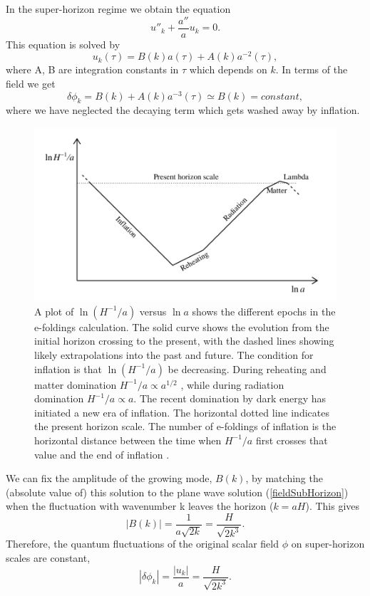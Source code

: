 \documentclass[11pt,a4paper,twoside]{book}
\begin{document}
In the super-horizon regime we obtain the equation
\begin{equation}
	\label{superHorizon}
	u''_{k} + \frac{a''}{a}u_{k}=0.
\end{equation}
This equation is solved by
\begin{equation}
	\label{solutionSuperHorizon}
	u_{k}(\tau) = B(k)a(\tau) + A(k)a^{-2}(\tau),
\end{equation}
where A, B are integration constants in $ \tau $ which depends on $ k $. In terms of the field we get
\begin{equation}
	\delta\phi_{k} = B(k) + A(k)a^{-3}(\tau) \simeq B(k) = constant,
\end{equation}
where we have neglected the decaying term which gets washed away by inflation.
\begin{figure}
	\centering
	\includegraphics[width=0.85\linewidth, height=0.3\textheight]{Images/Chap1/ComovingScale}
	\caption{A plot of $\ln (H^{-1}/a)$ versus $\ln a$ shows the different
		epochs in the e-foldings calculation. The solid curve shows the
		evolution from the initial horizon crossing to the present, with
		the dashed lines showing likely extrapolations into the past
		and future. The condition for inflation is that  $ \ln  (H^{-1}/a) $ be
		decreasing. During reheating and matter
		domination $ H^{-1}/a \propto a^{1/2} $
		, while during radiation domination  $ H^{-1}/a \propto a $. The recent domination by dark energy has
		initiated a new era of inflation. The horizontal dotted line
		indicates the present horizon scale. The number of e-foldings
		of inflation is the horizontal distance between the time when
		$H^{-1}/a$ first crosses that value and the end of inflation \cite{Chap1:ComovingRadiusPlot}.} 
	\label{fig:comovingscale}
\end{figure}

We can fix the amplitude of the growing mode, $ B(k) $, by matching the (absolute value of) this solution to the plane wave solution (\ref{fieldSubHorizon}) when the fluctuation with wavenumber k leaves the horizon ($ k = aH $). This gives
\begin{equation}
	|B(k)|= \frac{1}{a\sqrt{2k}} = \frac{H}{\sqrt{2k^{3}}}.
\end{equation}
Therefore, the quantum fluctuations of the original scalar field $ \phi $ on super-horizon scales are constant,
\begin{equation}
	\label{frozenField}
	|\delta \phi_{k}| = \frac{|u_{k}|}{a} = \frac{H}{\sqrt{2k^{3}}}.
\end{equation}
\end{document}
